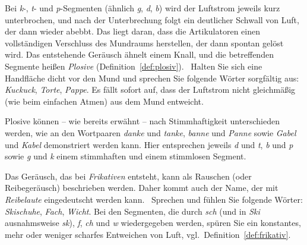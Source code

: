 \Np


Bei \textit{k}-, \textit{t}- und \textit{p}-Segmenten (ähnlich \textit{g}, \textit{d}, \textit{b}) wird der Luftstrom jeweils kurz unterbrochen, und nach der Unterbrechung folgt ein deutlicher Schwall von Luft, der dann wieder abebbt.
Das liegt daran, dass die Artikulatoren einen vollständigen Verschluss des Mundraums herstellen, der dann spontan gelöst wird.
Das entstehende Geräusch ähnelt einem Knall, und die betreffenden Segmente heißen \textit{Plosive} (Definition~\ref{def:plosiv}).
\TuBegin~Halten Sie sich eine Handfläche dicht vor den Mund und sprechen Sie folgende Wörter sorgfältig aus: \textit{Kuckuck}, \textit{Torte}, \textit{Pappe}.
Es fällt sofort auf, dass der Luftstrom nicht gleichmäßig (wie beim einfachen Atmen) aus dem Mund entweicht.


Plosive können -- wie bereits erwähnt -- nach Stimmhaftigkeit unterschieden werden, wie an den Wortpaaren \textit{danke} und \textit{tanke}, \textit{banne} und \textit{Panne} sowie \textit{Gabel} und \textit{Kabel} demonstriert werden kann.
Hier entsprechen jeweils \textit{d} und \textit{t}, \textit{b} und \textit{p} sowie \textit{g} und \textit{k} einem stimmhaften und einem stimmlosen Segment.

Das Geräusch, das bei \textit{Frikativen} entsteht, kann als Rauschen (oder Reibegeräusch) beschrieben werden.
Daher kommt auch der Name, der mit \textit{Reibelaute} eingedeutscht werden kann.
\TuBegin~Sprechen und fühlen Sie folgende Wörter: \textit{Skischuhe}, \textit{Fach}, \textit{Wicht}.
Bei den Segmenten, die durch \textit{sch} (und in \textit{Ski} ausnahmsweise \textit{sk}), \textit{f}, \textit{ch} und \textit{w} wiedergegeben werden, spüren Sie ein konstantes, mehr oder weniger scharfes Entweichen von Luft, vgl.\ Definition~\ref{def:frikativ}.

\Enl
\Np


